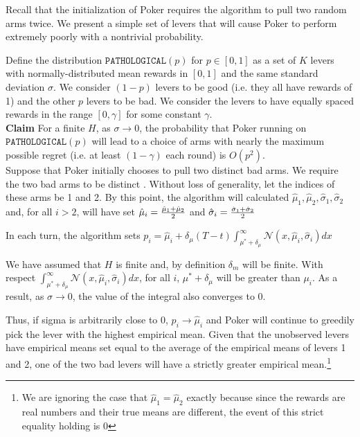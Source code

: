 \documentclass[12pt]{article}
\begin{document}
Recall that the initialization of Poker requires the algorithm to pull two random arms twice. We present a simple set of levers that will cause Poker to perform extremely poorly with a nontrivial probability.

Define the distribution $\texttt{PATHOLOGICAL}(p)$ for $p \in [0,1]$ as a set of $K$ levers with normally-distributed mean rewards in $[0,1]$ and the same standard deviation $\sigma$. We consider $(1-p)$ levers to be good (i.e. they all have rewards of 1) and the other $p$ levers to be bad. We consider the levers to have equally spaced rewards in the range $[0,\gamma]$ for some constant $\gamma$. \\

\noindent
\textbf{Claim} For a finite $H$, as $\sigma \rightarrow 0$, the probability that Poker running on $\texttt{PATHOLOGICAL}(p)$ will lead to a choice of arms with nearly the maximum possible regret (i.e. at least $(1-\gamma)$ each round) is $O(p^{2})$. \\ 

Suppose that Poker initially chooses to pull two distinct bad arms. We require the two bad arms to be distinct . Without loss of generality, let the indices of these arms be 1 and 2. By this point, the algorithm will calculated $\hat{\mu}_{1}, \hat{\mu}_{2}, \hat{\sigma}_{1},\hat{\sigma}_{2}$ and, for all $i > 2$, will have set $\hat{\mu}_{i}= {\hat{\mu}_{1}+\hat{\mu}_{2}\over 2}$ and $\hat{\sigma}_{i} = {\hat{\sigma}_{1}+\hat{\sigma}_{2}\over 2}$

In each turn, the algorithm sets $p_{i} = \hat{\mu}_{i} + \delta_{\mu}(T-t)\int_{\mu^{*}+\delta_{\mu}}^{\infty}\mathcal{N}(x,\hat{\mu}_{i}, \hat{\sigma}_{i})dx$

We have assumed that $H$ is finite and, by definition $\delta_{m}$ will be finite. With respect $\int_{\mu^{*}+\delta_{\mu}}^{\infty}\mathcal{N}(x,\hat{\mu}_{i}, \hat{\sigma}_{i})dx$, for all $i$, $\mu^{*}+\delta_{\mu}$ will be greater than $\mu_{i}$. As a result, as $\sigma \to 0$, the value of the integral also converges to 0.

Thus, if sigma is arbitrarily close to $0$, $p_{i} \rightarrow \hat{\mu}_{i}$ and Poker will continue to greedily pick the lever with the highest empirical mean. Given that the unobserved levers have empirical means set equal to the average of the empirical means of levers 1 and 2, one of the two bad levers will have a strictly greater empirical mean.\footnote{We are ignoring the case that $\hat{\mu}_{1} = \hat{\mu}_{2}$ exactly because since the rewards are real numbers and their true means are different, the event of this strict equality holding is 0}
\end{document}
